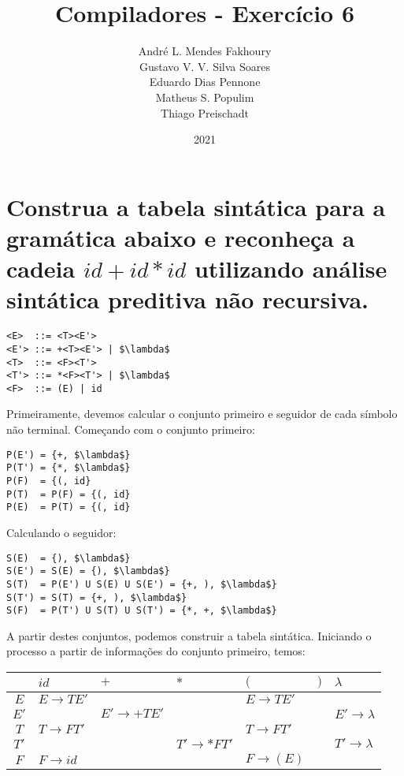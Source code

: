 \documentclass{article}
\title{Compiladores - Exercício 6}
\author{André L. Mendes Fakhoury\\
Gustavo V. V. Silva Soares\\
Eduardo Dias Pennone\\
Matheus S. Populim\\
Thiago Preischadt\\
}
\date{2021}
\begin{document}
\maketitle

\section{Construa a tabela sintática para a gramática abaixo e reconheça a cadeia $id+id*id$ utilizando análise sintática preditiva não recursiva.}

\begin{lstlisting}
<E>  ::= <T><E'>
<E'> ::= +<T><E'> | $\lambda$
<T>  ::= <F><T'>
<T'> ::= *<F><T'> | $\lambda$
<F>  ::= (E) | id
\end{lstlisting}

Primeiramente, devemos calcular o conjunto primeiro e seguidor de cada símbolo não terminal. Começando com o conjunto primeiro:

\begin{lstlisting} 
P(E') = {+, $\lambda$}
P(T') = {*, $\lambda$}
P(F)  = {(, id}
P(T)  = P(F) = {(, id}
P(E)  = P(T) = {(, id}
\end{lstlisting}

Calculando o seguidor:

\begin{lstlisting} 
S(E)  = {), $\lambda$}
S(E') = S(E) = {), $\lambda$}
S(T)  = P(E') U S(E) U S(E') = {+, ), $\lambda$}
S(T') = S(T) = {+, ), $\lambda$}
S(F)  = P(T') U S(T) U S(T') = {*, +, $\lambda$}
\end{lstlisting}

A partir destes conjuntos, podemos construir a tabela sintática. Iniciando o processo a partir de informações do conjunto primeiro, temos:

\begin{center}
\begin{tabular}{ |c|m{2cm}|m{2cm}|m{2cm}|m{2cm}|m{2cm}|m{2cm}| } 
 \hline
 & $id$ & $+$ & $*$ & $($ & $)$ & $\lambda$ \\
 \hline
 $E$ & $E \rightarrow TE'$ & $ $ & $ $ & $E \rightarrow TE'$ & $ $ & $ $ \\
 \hline
 $E'$ & $ $ & $E' \rightarrow +TE'$ & $ $ & $ $ & $ $ & $E' \rightarrow \lambda$ \\
 \hline
 $T$ & $T \rightarrow FT'$ & $ $ & $ $ & $T \rightarrow FT'$ & $ $ & $ $ \\
 \hline
 $T'$ & $ $ & $ $ & $T' \rightarrow *FT'$ & $ $ & $ $ & $T' \rightarrow \lambda$ \\
 \hline
 $F$ & $F \rightarrow id$ & $ $ & $ $ & $F \rightarrow (E)$ & $ $ & $ $ \\
 \hline
\end{tabular}
\end{center}
\end{document}
